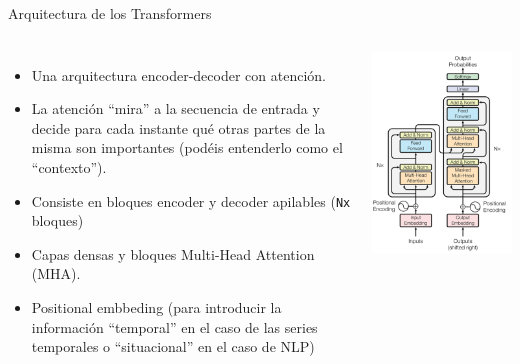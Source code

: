 \begin{frame}{Arquitectura de los Transformers}

\begin{columns}
\begin{itemize}
    \item Una arquitectura encoder-decoder con atención.
    \item La atención ``mira'' a la secuencia de entrada y decide para cada instante qué otras partes de la misma son importantes (podéis entenderlo como el ``contexto'').
    \item Consiste en bloques encoder y decoder apilables (\texttt{Nx} bloques)
    \item Capas densas y bloques Multi-Head Attention (MHA).
    \item Positional embbeding (para introducir la información ``temporal'' en el caso de las series temporales o ``situacional'' en el caso de NLP)
\end{itemize}

\vspace{0.2em}
\includegraphics[width=\textwidth]{Slides/figures/02_Metodos_Generativos/trans-arch.png}

\end{columns}
\end{frame}

